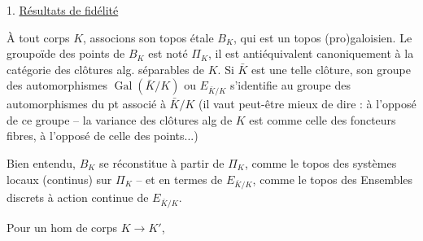 1. \uline{Résultats de fidélité}

À tout corps $K$, associons son topos étale $B_K$, qui est un topos (pro)galoisien. Le groupoïde des points de $B_K$ est noté $\Pi_K$, il est antiéquivalent canoniquement à la catégorie des clôtures alg. séparables de $K$. Si $\bar K$ est une telle clôture, son groupe des automorphismes $\operatorname{Gal}(\bar K/K)$ ou $E_{\bar K/K}$ s'identifie au groupe des automorphismes du pt  associé à $\bar K/K$ (il vaut peut-être mieux de dire : à l'opposé de ce groupe --  la variance des clôtures alg de $K$ est comme celle des foncteurs fibres, à l'opposé de celle des points...)

Bien entendu, $B_K$ se réconstitue à partir de $\Pi_K$, comme le topos des systèmes locaux (continus) sur $\Pi_K$ -- et en termes de $E_{\bar K/K}$, comme le topos des Ensembles discrets à action continue de $E_{\bar K/K}$.

Pour un hom de corps $K\longrightarrow K'$,
